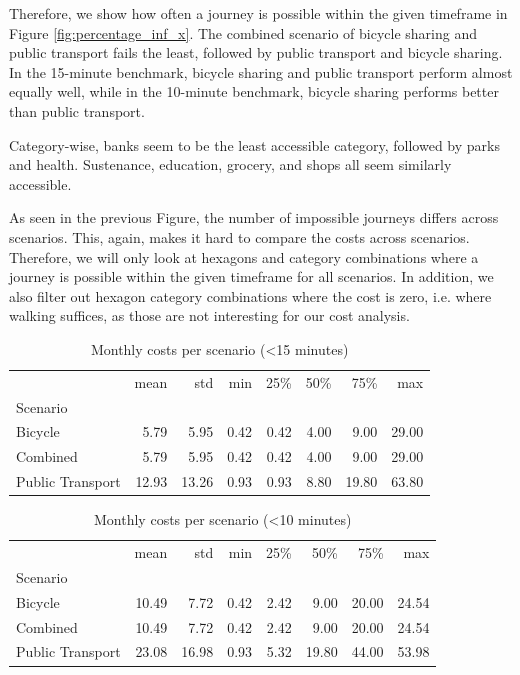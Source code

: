 Therefore, we show how often a journey is possible within the given timeframe in Figure \ref{fig:percentage_inf_x}.
The combined scenario of bicycle sharing and public transport fails the least, followed by public transport and bicycle sharing.
In the 15-minute benchmark, bicycle sharing and public transport perform almost equally well, while in the 10-minute benchmark, bicycle sharing performs better than public transport.

Category-wise, banks seem to be the least accessible category, followed by parks and health.
Sustenance, education, grocery, and shops all seem similarly accessible.

As seen in the previous Figure, the number of impossible journeys differs across scenarios.
This, again, makes it hard to compare the costs across scenarios.
Therefore, we will only look at hexagons and category combinations where a journey is possible within the given timeframe for all scenarios.
In addition, we also filter out hexagon category combinations where the cost is zero, i.e. where walking suffices, as those are not interesting for our cost analysis.

\begin{table}
  \caption{Monthly costs per scenario (<15 minutes)}
  \label{tab:monthly_costs_per_scenario_15}
  \begin{center}
    \begin{tabular}{lrrrrrrr}
     & mean & std & min & 25\% & 50\% & 75\% & max \\
    Scenario &  &  &  &  &  &  &  \\
    Bicycle & 5.79 & 5.95 & 0.42 & 0.42 & 4.00 & 9.00 & 29.00 \\
    Combined & 5.79 & 5.95 & 0.42 & 0.42 & 4.00 & 9.00 & 29.00 \\
    Public Transport & 12.93 & 13.26 & 0.93 & 0.93 & 8.80 & 19.80 & 63.80 \\
    \end{tabular}
  \end{center}
\end{table}


\begin{table}
  \caption{Monthly costs per scenario (<10 minutes)}
  \label{tab:monthly_costs_per_scenario_10}
  \begin{center}
    \begin{tabular}{lrrrrrrr}
     & mean & std & min & 25\% & 50\% & 75\% & max \\
    Scenario &  &  &  &  &  &  &  \\
    Bicycle & 10.49 & 7.72 & 0.42 & 2.42 & 9.00 & 20.00 & 24.54 \\
    Combined & 10.49 & 7.72 & 0.42 & 2.42 & 9.00 & 20.00 & 24.54 \\
    Public Transport & 23.08 & 16.98 & 0.93 & 5.32 & 19.80 & 44.00 & 53.98 \\
    \end{tabular}
  \end{center}
\end{table}

